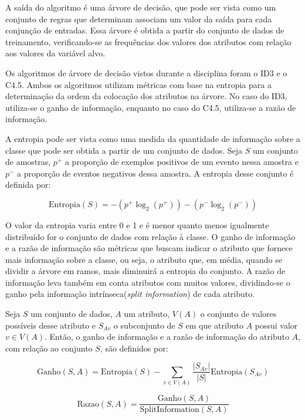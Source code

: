 \documentclass{article}
\begin{document}
A saída do algoritmo é uma árvore de decisão, que pode ser vista como um conjunto de regras que determinam associam um valor da saída para cada conjunção de entradas.
Essa árvore é obtida a partir do conjunto de dados de treinamento, verificando-se as frequências dos valores dos atributos com relação aos valores da variável alvo.

Os algoritmos de árvore de decisão vistos durante a disciplina foram o ID3 e o C4.5.
Ambos os algoritmos utilizam métricas com base na entropia para a determinação da ordem da colocação dos atributos na árvore.
No caso do ID3, utiliza-se o ganho de informação, enquanto no caso do C4.5, utiliza-se a razão de informação.

A entropia pode ser vista como uma medida da quantidade de informação sobre a classe que pode ser obtida a partir de um conjunto de dados.
Seja $S$ um conjunto de amostras, $p^+$ a proporção de exemplos positivos de um evento nessa amostra e $p^-$ a proporção de eventos negativos dessa amostra.
A entropia desse conjunto é definida por:

\begin{equation}
\mathrm{Entropia}(S) = -(p^+ \log_2(p^+)) - (p^- \log_2(p^-))
\end{equation}

O valor da entropia varia entre 0 e 1 e é menor quanto menos igualmente distribuído for o conjunto de dados com relação à classe.
O ganho de informação e a razão de informação são métricas que buscam indicar o atributo que fornece mais informação sobre a classe,
ou seja, o atributo que, em média, quando se dividir a árvore em ramos, mais diminuirá a entropia do conjunto.
A razão de informação leva também em conta atributos com muitos valores, dividindo-se o ganho pela informação intrínseca({\it split information}) de cada atributo.

Seja $S$ um conjunto de dados, $A$ um atributo, $V(A)$ o conjunto de valores possíveis desse atributo e $S_{Av}$ o subconjunto de $S$ em que atributo $A$ possui valor $v \in V(A)$.
Então, o ganho de informação e a razão de informação do atributo $A$, com relação ao conjunto $S$, são definidos por:

\small
\begin{equation}
\mathrm{Ganho}(S,A)=\mathrm{Entropia}(S)-\sum_{v \in V(A)}\frac{\left|S_{Av}\right|}{\left|S\right|} \mathrm{Entropia}(S_{Av})
\end{equation}

\begin{equation}
\mathrm{Razao}(S,A)=\frac{\mathrm{Ganho}(S,A)}{\mathrm{SplitInformation}(S,A)}
\end{equation}
\end{document}
